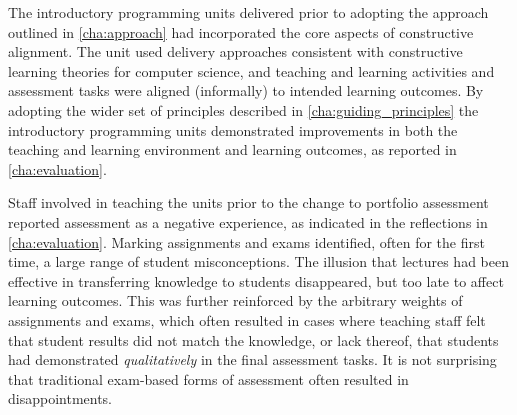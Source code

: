 
The introductory programming units delivered prior to adopting the approach outlined in \cref{cha:approach} had incorporated the core aspects of constructive alignment. The unit used delivery approaches consistent with constructive learning theories for computer science, and teaching and learning activities and assessment tasks were aligned (informally) to intended learning outcomes. By adopting the wider set of principles described in \cref{cha:guiding_principles} the introductory programming units demonstrated improvements in both the teaching and learning environment and learning outcomes, as reported in \cref{cha:evaluation}.

Staff involved in teaching the units prior to the change to portfolio assessment reported assessment as a negative experience, as indicated in the reflections in \cref{cha:evaluation}. Marking assignments and exams identified, often for the first time, a large range of student misconceptions. The illusion that lectures had been effective in transferring knowledge to students disappeared, but too late to affect learning outcomes. This was further reinforced by the arbitrary weights of assignments and exams, which often resulted in cases where teaching staff felt that student results did not match the knowledge, or lack thereof, that students had demonstrated \emph{qualitatively} in the final assessment tasks. It is not surprising that traditional exam-based forms of assessment often resulted in disappointments.

